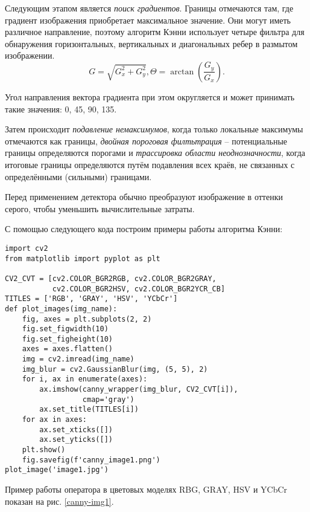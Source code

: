 Следующим этапом является {\it поиск градиентов}. Границы отмечаются 
там, где градиент изображения приобретает максимальное значение. Они 
могут иметь различное направление, поэтому алгоритм Кэнни использует
четыре фильтра для обнаружения горизонтальных, вертикальных и 
диагональных ребер в размытом изображении.
\begin{equation}
    G = \sqrt{G_x^2 + G_y^2},
    \Theta = \arctan (\frac{G_y}{G_x}).
	\label{canny-2}
\end{equation}

Угол направления вектора градиента при этом округляется и может 
принимать такие значения: 0\textdegree, 45\textdegree, 90\textdegree,
135\textdegree.

Затем происходит {\it подавление немаксимумов}, когда только локальные
максимумы отмечаются как границы, {\it двойная пороговая филтьтрация}
-- потенциальные границы определяются порогами и {\it трассировка
области неоднозначности}, когда итоговые границы определяются путём 
подавления всех краёв, не связанных с определёнными (сильными) 
границами.

Перед применением детектора обычно преобразуют изображение в оттенки
серого, чтобы уменьшить вычислительные затраты. 

С помощью следующего кода построим примеры работы алгоритма Кэнни:

\begin{verbatim}
import cv2
from matplotlib import pyplot as plt

CV2_CVT = [cv2.COLOR_BGR2RGB, cv2.COLOR_BGR2GRAY,
           cv2.COLOR_BGR2HSV, cv2.COLOR_BGR2YCR_CB]
TITLES = ['RGB', 'GRAY', 'HSV', 'YCbCr']
def plot_images(img_name):
    fig, axes = plt.subplots(2, 2)
    fig.set_figwidth(10)
    fig.set_figheight(10)
    axes = axes.flatten()
    img = cv2.imread(img_name)
    img_blur = cv2.GaussianBlur(img, (5, 5), 2)
    for i, ax in enumerate(axes):
        ax.imshow(canny_wrapper(img_blur, CV2_CVT[i]),
                  cmap='gray')
        ax.set_title(TITLES[i])
    for ax in axes:
        ax.set_xticks([])
        ax.set_yticks([])
    plt.show()
    fig.savefig(f'canny_image1.png')
plot_image('image1.jpg')
\end{verbatim}

\newpage

Пример работы оператора в цветовых моделях RBG, GRAY, HSV и YCbCr 
показан на рис. \ref{canny-img1}.


